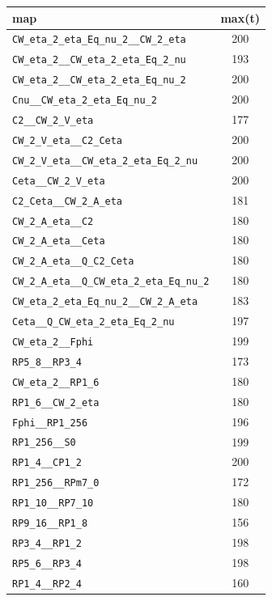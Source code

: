 \begin{table}\begin{tabular}{|l|c|}\hline
map & max(t)\\\hline
\texttt{CW\_eta\_2\_eta\_Eq\_nu\_2\_\_CW\_2\_eta} & 200\\\hline
\texttt{CW\_eta\_2\_\_CW\_eta\_2\_eta\_Eq\_2\_nu} & 193\\\hline
\texttt{CW\_eta\_2\_\_CW\_eta\_2\_eta\_Eq\_nu\_2} & 200\\\hline
\texttt{Cnu\_\_CW\_eta\_2\_eta\_Eq\_nu\_2} & 200\\\hline
\texttt{C2\_\_CW\_2\_V\_eta} & 177\\\hline
\texttt{CW\_2\_V\_eta\_\_C2\_Ceta} & 200\\\hline
\texttt{CW\_2\_V\_eta\_\_CW\_eta\_2\_eta\_Eq\_2\_nu} & 200\\\hline
\texttt{Ceta\_\_CW\_2\_V\_eta} & 200\\\hline
\texttt{C2\_Ceta\_\_CW\_2\_A\_eta} & 181\\\hline
\texttt{CW\_2\_A\_eta\_\_C2} & 180\\\hline
\texttt{CW\_2\_A\_eta\_\_Ceta} & 180\\\hline
\texttt{CW\_2\_A\_eta\_\_Q\_C2\_Ceta} & 180\\\hline
\texttt{CW\_2\_A\_eta\_\_Q\_CW\_eta\_2\_eta\_Eq\_nu\_2} & 180\\\hline
\texttt{CW\_eta\_2\_eta\_Eq\_nu\_2\_\_CW\_2\_A\_eta} & 183\\\hline
\texttt{Ceta\_\_Q\_CW\_eta\_2\_eta\_Eq\_2\_nu} & 197\\\hline
\texttt{CW\_eta\_2\_\_Fphi} & 199\\\hline
\texttt{RP5\_8\_\_RP3\_4} & 173\\\hline
\texttt{CW\_eta\_2\_\_RP1\_6} & 180\\\hline
\texttt{RP1\_6\_\_CW\_2\_eta} & 180\\\hline
\texttt{Fphi\_\_RP1\_256} & 196\\\hline
\texttt{RP1\_256\_\_S0} & 199\\\hline
\texttt{RP1\_4\_\_CP1\_2} & 200\\\hline
\texttt{RP1\_256\_\_RPm7\_0} & 172\\\hline
\texttt{RP1\_10\_\_RP7\_10} & 180\\\hline
\texttt{RP9\_16\_\_RP1\_8} & 156\\\hline
\texttt{RP3\_4\_\_RP1\_2} & 198\\\hline
\texttt{RP5\_6\_\_RP3\_4} & 198\\\hline
\texttt{RP1\_4\_\_RP2\_4} & 160\\\hline

\end{tabular}
\end{table}
